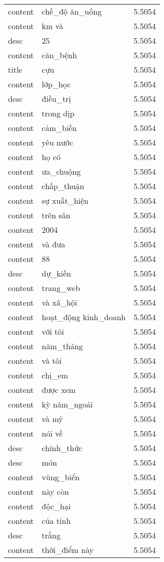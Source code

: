 \documentclass{article}
\begin{document}
\begin{tabular}{lll}
content & chế\_độ ăn\_uống & 5.5054\\
content & km và & 5.5054\\
desc & 25 & 5.5054\\
content & căn\_bệnh & 5.5054\\
title & cựu & 5.5054\\
content & lớp\_học & 5.5054\\
desc & điều\_trị & 5.5054\\
content & trong dịp & 5.5054\\
content & cảm\_biến & 5.5054\\
content & yêu nước & 5.5054\\
content & họ có & 5.5054\\
content & ưa\_chuộng & 5.5054\\
content & chấp\_thuận & 5.5054\\
content & sự xuất\_hiện & 5.5054\\
content & trên sân & 5.5054\\
content & 2004 & 5.5054\\
content & và đưa & 5.5054\\
content & 88 & 5.5054\\
desc & dự\_kiến & 5.5054\\
content & trang\_web & 5.5054\\
content & và xã\_hội & 5.5054\\
content & hoạt\_động kinh\_doanh & 5.5054\\
content & với tôi & 5.5054\\
content & năm\_tháng & 5.5054\\
content & và tôi & 5.5054\\
content & chị\_em & 5.5054\\
content & được xem & 5.5054\\
content & kỳ năm\_ngoái & 5.5054\\
content & và mỹ & 5.5054\\
content & nói về & 5.5054\\
desc & chính\_thức & 5.5054\\
desc & món & 5.5054\\
content & vùng\_biển & 5.5054\\
content & này còn & 5.5054\\
content & độc\_hại & 5.5054\\
content & của tỉnh & 5.5054\\
desc & trắng & 5.5054\\
content & thời\_điểm này & 5.5054\\

\end{tabular}
\end{document}
